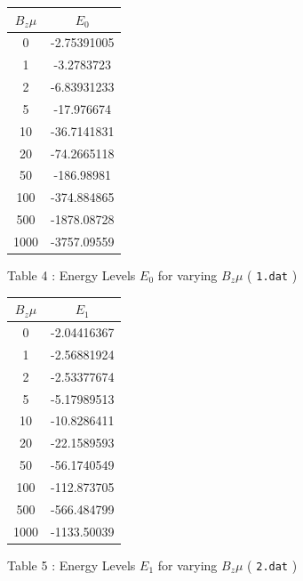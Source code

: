 \documentclass[a4paper]{IEEEtran}
\begin{document}
    \begin{table}
        \begin{center}
        \begin{tabular}{|c|c|} \hline
        $B_z\mu$ & $E_0$  \\ \hline \hline
        0    & -2.75391005 \\ \hline
        1    & -3.2783723     \\ \hline 
        2    & -6.83931233  \\ \hline 
        5    & -17.976674 \\ \hline 
        10   & -36.7141831\\ \hline 
        20   & -74.2665118\\ \hline 
        50   & -186.98981\\ \hline 
        100  & -374.884865\\ \hline 
        500  & -1878.08728\\ \hline 
        1000 & -3757.09559\\ \hline 
        \end{tabular}
        \vspace{1mm}
        \begin{center}
            Table 4 : Energy Levels $E_0$ for varying $B_z\mu$ ( \texttt{1.dat} )
        \end{center}
        \end{center}
    \end{table}

    \begin{table} 
        \begin{center}
        \begin{tabular}{|c|c|} \hline
        $B_z\mu$ & $E_1$  \\ \hline \hline
        0    & -2.04416367 \\ \hline
        1    & -2.56881924 \\ \hline
        2    & -2.53377674 \\ \hline
        5    & -5.17989513 \\ \hline
        10   & -10.8286411 \\ \hline
        20   & -22.1589593 \\ \hline
        50   & -56.1740549 \\ \hline
        100  & -112.873705 \\ \hline
        500  & -566.484799  \\ \hline
        1000 & -1133.50039 \\ \hline
        \end{tabular}
         \vspace{1mm}
        \begin{center}
            Table 5 : Energy Levels $E_1$ for varying $B_z\mu$ ( \texttt{2.dat} )
        \end{center}
        \end{center}
    \end{table} 
\end{document}
